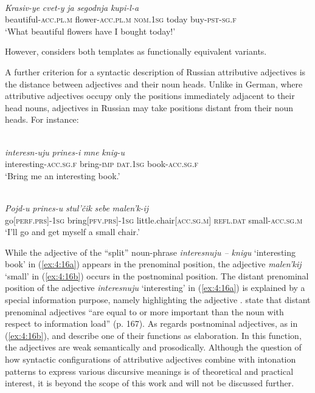 \ea
\label{ex:4:15}
\citep[153]{zemskaja}\\
\gll \textit{Krasiv-ye} \textit{cvet-y} \textit{ja} \textit{segodnja} \textit{kupi-l-a}\\
	beautiful-\textsc{acc.pl.m} flower-\textsc{acc.pl.m} \textsc{nom.1sg} today buy-\textsc{pst-sg.f}\\
\glt `What beautiful flowers have I bought today!'
\z

\noindent However, \citet[208, 211, 221--222]{lapteva} considers both templates as functionally equivalent variants.

A further criterion for a syntactic description of Russian attributive adjectives is the distance between adjectives and their noun heads. Unlike in German, where attributive adjectives occupy only the positions immediately adjacent to their head nouns, adjectives in Russian may take positions distant from their noun heads. For instance:

\ea
\ea{\label{ex:4:16a}}
\citep[165]{miller-weinert}\\
\gll \textit{interesn-uju} \textit{prines-i} \textit{mne} \textit{knig-u}\\
	interesting-\textsc{acc.sg.f} bring-\textsc{imp} \textsc{dat.1sg} book-\textsc{acc.sg.f}\\
\glt `Bring me an interesting book.'

\ex
\label{ex:4:16b}
\citep[213]{lapteva}\\
\gll \textit{Pojd-u} \textit{prines-u} \textit{stul'čik} \textit{sebe} \textit{malen'k-ij}\\
	go[\textsc{perf.prs}]-\textsc{1sg} bring[\textsc{pfv.prs}]-\textsc{1sg} little.chair[\textsc{acc.sg.m}] \textsc{refl.dat} small-\textsc{acc.sg.m}\\
\glt `I'll go and get myself a small chair.'
\z
\z

\noindent While the adjective of the “split” noun-phrase \textit{interesnuju -- knigu} `interesting book' in (\ref{ex:4:16a}) appears in the prenominal position, the adjective \textit{malen'kij} `small' in (\ref{ex:4:16b}) occurs in the postnominal position. The distant prenominal position of the adjective \textit{interesnuju} `interesting' in (\ref{ex:4:16a}) is explained by a special information purpose, namely highlighting the adjective \citep[153]{zemskaja}. \citet{miller-weinert} state that distant prenominal adjectives ``are equal to or more important than the noun with respect to information load'' (p. 167). As regards postnominal adjectives, as in (\ref{ex:4:16b}), \citet[213]{lapteva}  and \citet[153]{zemskaja} describe one of their functions as elaboration. In this function, the adjectives are weak semantically and prosodically. Although the question of how syntactic configurations of attributive adjectives combine with intonation patterns to express various discursive meanings is of theoretical and practical interest, it is beyond the scope of this work and will not be discussed further.

